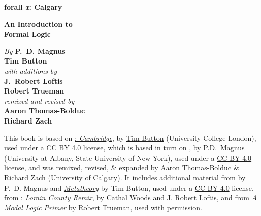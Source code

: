 
\iflatexml\else

\pagestyle{empty}

\vspace*{80pt}

\begin{raggedleft}
\fontsize{30pt}{24pt}\sffamily
\selectfont
  \textbf{forall 
  {\fontsize{37pt}{24pt}\selectfont\rmfamily\textit{x}}: 
  Calgary}

\medskip\fontsize{18pt}{20pt}\selectfont

\textbf{An Introduction to\\ Formal Logic}

\vfill
\fontsize{12pt}{16pt}\selectfont \textit{By } \textbf{P.~D. Magnus}\\
\textbf{Tim Button}\\
\textit{with additions by}\\
\textbf{J.~Robert Loftis}\\
\textbf{Robert Trueman}\\
\textit{remixed and revised by}\\
\textbf{Aaron Thomas-Bolduc}\\ \textbf{Richard Zach}

\vfill
\textbf{\forallxversion}\par
\end{raggedleft}


\newpage


\noindent\small%
\fi
This book is based on
\href{https://www.homepages.ucl.ac.uk/~uctytbu/OERs.html}{\forallx:
\emph{Cambridge}}, by 
\href{https://www.homepages.ucl.ac.uk/~uctytbu/}{Tim Button} (University College London), 
used under a \href{https://creativecommons.org/licenses/by/4.0/}{CC BY
4.0} license, which is based in turn
on \href{https://www.fecundity.com/logic/}{\forallx}, by
\href{https://www.fecundity.com/job/}{P.D.\ Magnus} 
(University at Albany, State University of New York),
used under a \href{https://creativecommons.org/licenses/by/4.0/}{CC BY
4.0} license, 
and was remixed, revised, \& expanded by Aaron
Thomas-Bolduc \& \href{https://richardzach.org/}{Richard Zach}
(University of Calgary).
It includes additional material from \forallx{} by P.~D. Magnus and
\href{https://www.homepages.ucl.ac.uk/~uctytbu/OERs.html}{\emph{Metatheory}} by Tim Button, 
used under a \href{https://creativecommons.org/licenses/by/4.0/}{CC BY
4.0} license, 
from \href{https://github.com/rob-helpy-chalk/openintroduction}{\forallx: \emph{Lorain
County Remix}},
by \href{https://sites.google.com/site/cathalwoods/}{Cathal Woods} and
J. Robert Loftis, and from \href{http://www.rtrueman.com/uploads/7/0/3/2/70324387/modal_logic_primer.pdf}{\emph{A Modal Logic Primer}} by \href{http://www.rtrueman.com/}{Robert Trueman}, used with permission.

